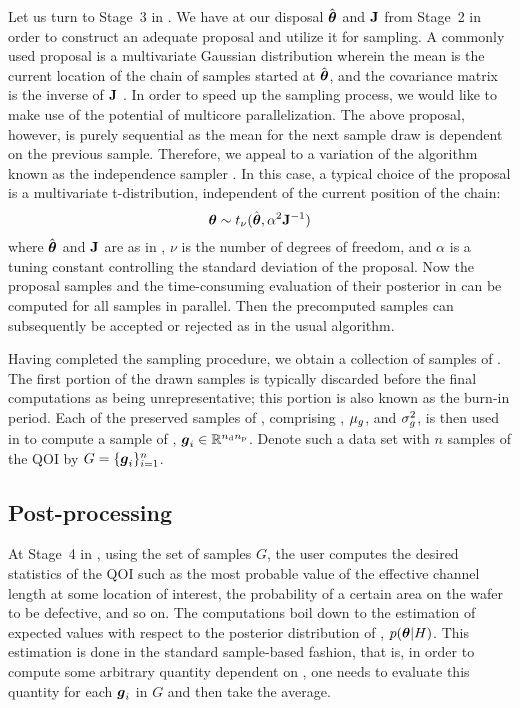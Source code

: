 Let us turn to Stage~3 in . We have at our disposal $\hat{\boldsymbol{\theta}}$
and $\mathbf{J}$ from Stage~2 in order to construct an adequate proposal and utilize
it for sampling. A commonly used proposal is a multivariate Gaussian
distribution wherein the mean is the current location of the chain of samples
started at $\hat{\boldsymbol{\theta}}$, and the covariance matrix is the inverse of $\mathbf{J}$
\cite{gelman2004}. In order to speed up the sampling process, we would like to
make use of the potential of multicore parallelization. The above proposal,
however, is purely sequential as the mean for the next sample draw is dependent
on the previous sample. Therefore, we appeal to a variation of the 
algorithm known as the independence sampler \cite{gelman2004}. In this case, a
typical choice of the proposal is a multivariate t-distribution, independent of
the current position of the chain:
\begin{equation} \elab{proposal}
  \vt \sim t_\nu(\hat{\vt}, \alpha^2 \m{J}^{-1})
\end{equation}
where $\hat{\boldsymbol{\theta}}$ and $\mathbf{J}$ are as in , $\nu$ is the number
of degrees of freedom, and $\alpha$ is a tuning constant controlling the
standard deviation of the proposal. Now the proposal samples and the
time-consuming evaluation of their posterior in  can be computed
for all samples in parallel. Then the precomputed samples can subsequently be
accepted or rejected as in the usual  algorithm.

Having completed the sampling procedure, we obtain a collection of samples of
\vt. The first portion of the drawn samples is typically discarded before the
final computations as being unrepresentative; this portion is also known as the
burn-in period. Each of the preserved samples of \vt, comprising \vz, $\mu_g$,
and $\sigma^2_g$, is then used in  to compute a sample
of \g, $\boldsymbol{g}_i \in \mathbb{R}^{{n_\mathrm{d}} {n_\mathrm{p}}}$. Denote such a data set with $n$ samples of
the \ac{QOI} by $G = \{ \boldsymbol{g}_i \}_{i = 1}^n$.

\subsection{Post-processing}

At Stage~4 in , using the set of samples $G$, the user computes
the desired statistics of the \ac{QOI} such as the most probable value of the
effective channel length at some location of interest, the probability of a
certain area on the wafer to be defective, and so on. The computations boil down
to the estimation of expected values with respect to the posterior distribution
of \vt, $p(\boldsymbol{\theta} | H)$. This estimation is done in the standard sample-based
fashion, that is, in order to compute some arbitrary quantity dependent on \g,
one needs to evaluate this quantity for each $\boldsymbol{g}_i$ in $G$ and then take the
average.

